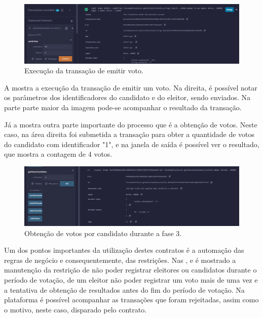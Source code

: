 \documentclass[portuguese]{textolivre}
\begin{document}
	\begin{figure}[htbp]
		\centering
		\begin{minipage}{1\textwidth}
			\includegraphics[width=\textwidth]{fig-009.png} %
			\caption{Execução da transação de emitir voto.}
			\label{emitirvoto}
		\end{minipage}
	\end{figure}
	
	A  mostra a execução da transação de emitir um voto. Na direita, é possível notar os parâmetros dos identificadores do candidato e do eleitor, sendo enviados. Na parte parte maior da imagem pode-se acompanhar o resultado da transação.
	
	Já a  mostra outra parte importante do processo que é a obtenção de votos. Neste caso, na área direita foi submetida a transação para obter a quantidade de votos do candidato com identificador "1", e na janela de saída é possível ver o resultado, que mostra a contagem de 4 votos.
	
	
	\begin{figure}[htbp]
		\centering
		\begin{minipage}{1\textwidth}
			\includegraphics[width=\textwidth]{fig-010.png} %
			\caption{Obtenção de votos por candidato durante a fase 3.}
			\label{obtencaodevotos}
		\end{minipage}
	\end{figure}
	
	Um dos pontos importantes da utilização destes contratos é a automação das regras de negócio e consequentemente, das restrições. Nas ,  e  é mostrado a manutenção da restrição de não poder registrar eleitores ou candidatos durante o período de votação, de um eleitor não poder registrar um voto mais de uma vez e a tentativa de obtenção de resultados antes do fim do período de votação. Na plataforma é possível acompanhar as transações que foram rejeitadas, assim como o motivo, neste caso, disparado pelo contrato.
	
\end{document}
